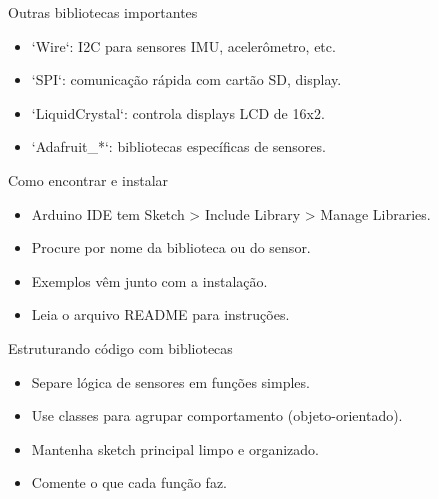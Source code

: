 \documentclass[10pt]{beamer}
\begin{document}
\begin{frame}{Outras bibliotecas importantes}
  \begin{itemize}
    \item `Wire`: I2C para sensores IMU, acelerômetro, etc.
    \item `SPI`: comunicação rápida com cartão SD, display.
    \item `LiquidCrystal`: controla displays LCD de 16x2.
    \item `Adafruit_*`: bibliotecas específicas de sensores.
  \end{itemize}
\end{frame}

\begin{frame}{Como encontrar e instalar}
  \begin{itemize}
    \item Arduino IDE tem Sketch > Include Library > Manage Libraries.
    \item Procure por nome da biblioteca ou do sensor.
    \item Exemplos vêm junto com a instalação.
    \item Leia o arquivo README para instruções.
  \end{itemize}
\end{frame}

\begin{frame}{Estruturando código com bibliotecas}
  \begin{itemize}
    \item Separe lógica de sensores em funções simples.
    \item Use classes para agrupar comportamento (objeto-orientado).
    \item Mantenha sketch principal limpo e organizado.
    \item Comente o que cada função faz.
  \end{itemize}
\end{frame}
\end{document}
